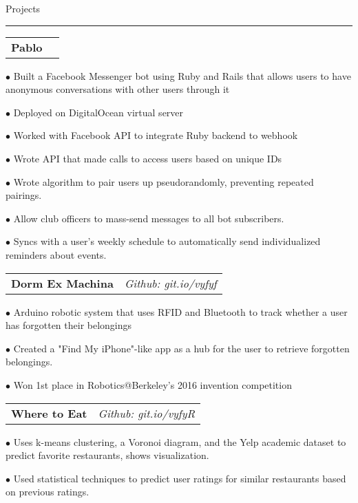 \documentclass[11pt,letterpaper]{article}
\makeatletter
\newcommand{\bulletpoint}{\rule{0cm}{2pt}$\bullet$  }
\newenvironment{topic}[1]
    {
    \tabto{225pt}
    \large #1
    \vspace*{0.03in}
    \hrule 
    \vspace*{0.05in}
    }
    {
    }
\newenvironment{event}
    {
    \begin{tabular*}{\textwidth}{l@{\extracolsep{\fill}}r}
    }
    {
    \end{tabular*}
    }
\newenvironment{detail}
    {
    \normalsize
    }
    {
    \vspace*{0.02in}
    }
\makeatother
\begin{document}
    \begin{topic}{Projects}
        \begin{event}
        \textbf{Pablo}
        \end{event}
            \begin{detail}
                \bulletpoint Built a Facebook Messenger bot using Ruby and Rails that allows users to have anonymous conversations with other users through it \\
                \bulletpoint Deployed on DigitalOcean virtual server \\
                \bulletpoint Worked with Facebook API to integrate Ruby backend to webhook \\
                \bulletpoint Wrote API that made calls to access users based on unique IDs \\
                \bulletpoint Wrote algorithm to pair users up pseudorandomly, preventing repeated pairings. \\
                \bulletpoint Allow club officers to mass-send messages to all bot subscribers. \\
                \bulletpoint Syncs with a user's weekly schedule to automatically send individualized reminders about events.
            \end{detail}

        \begin{event}
            \textbf{Dorm Ex Machina} & \emph{Github: git.io/vyfyf}
        \end{event}
            \begin{detail}
                \bulletpoint Arduino robotic system that uses RFID and Bluetooth to track whether a user has forgotten their belongings \\
                \bulletpoint Created a "Find My iPhone"-like app as a hub for the user to retrieve forgotten belongings. \\
                \bulletpoint Won 1st place in Robotics@Berkeley's 2016 invention competition
            \end{detail}

        \begin{event}
        \textbf{Where to Eat} & \emph{Github: git.io/vyfyR}
        \end{event}
            \begin{detail}
                \bulletpoint Uses k-means clustering, a Voronoi diagram, and the Yelp academic dataset to predict favorite restaurants, shows visualization. \\
                \bulletpoint Used statistical techniques to predict user ratings for similar restaurants based on previous ratings.
            \end{detail}

    \end{topic} \vspace*{0.1in}
\end{document}
